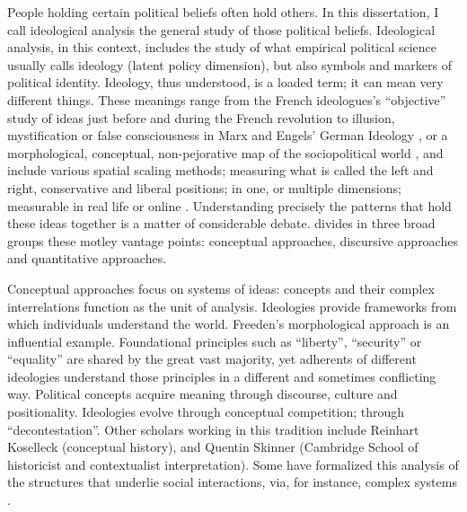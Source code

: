 \documentclass[
  openany]{book}
\begin{document}
People holding certain political beliefs often hold others. In this dissertation, I call ideological analysis the general study of those political beliefs. Ideological analysis, in this context, includes the study of what empirical political science usually calls ideology (latent policy dimension), but also symbols and markers of political identity. Ideology, thus understood, is a loaded term; it can mean very different things. These meanings range from the French ideologues's ``objective'' study of ideas just before and during the French revolution \citep{kennedy1979ideology, head1985ideology} to illusion, mystification or false consciousness in Marx and Engels' German Ideology \citeyearpar{marx1970german}, or a morphological, conceptual, non-pejorative map of the sociopolitical world \citep{freeden2003ideology}, and include various spatial scaling methods; measuring what is called the left and right, conservative and liberal positions; in one, or multiple dimensions; measurable in real life \citep{downs1957economic, aldrich1977method, hare2015using, cochrane2015left} or online \citep{barbera2015birds, temporao2018ideological}. Understanding precisely the patterns that hold these ideas together is a matter of considerable debate. \citet{maynard2013map} divides in three broad groups these motley vantage points: conceptual approaches, discursive approaches and quantitative approaches.

Conceptual approaches focus on systems of ideas: concepts and their complex interrelations function as the unit of analysis. Ideologies provide frameworks from which individuals understand the world. Freeden's \citeyearpar{freeden2006ideology} morphological approach is an influential example. Foundational principles such as ``liberty'', ``security'' or ``equality'' are shared by the great vast majority, yet adherents of different ideologies understand those principles in a different and sometimes conflicting way. Political concepts acquire meaning through discourse, culture and positionality. Ideologies evolve through conceptual competition; through ``decontestation''. Other scholars working in this tradition include Reinhart Koselleck (conceptual history), and Quentin Skinner (Cambridge School of historicist and contextualist interpretation). Some have formalized this analysis of the structures that underlie social interactions, via, for instance, complex systems \citep{thagard2012mapping, homer2014conceptual}.
\end{document}
